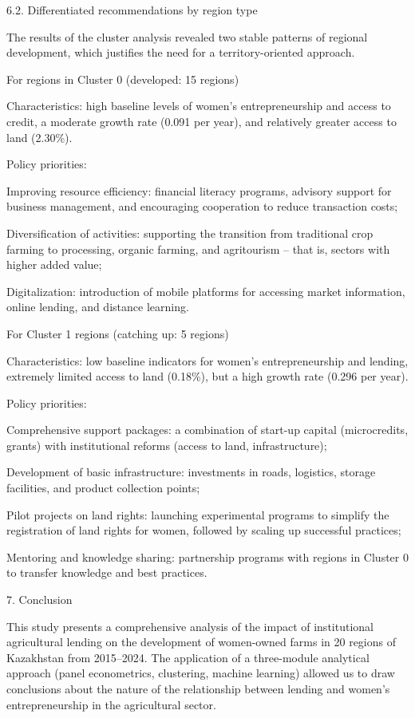 \documentclass[
]{article}
\begin{document}
6.2. Differentiated recommendations by region type

The results of the cluster analysis revealed two stable patterns of
regional development, which justifies the need for a territory-oriented
approach.

For regions in Cluster 0 (developed: 15 regions)

Characteristics: high baseline levels of women's entrepreneurship and
access to credit, a moderate growth rate (0.091 per year), and
relatively greater access to land (2.30\%).

Policy priorities:

Improving resource efficiency: financial literacy programs, advisory
support for business management, and encouraging cooperation to reduce
transaction costs;

Diversification of activities: supporting the transition from
traditional crop farming to processing, organic farming, and agritourism
-- that is, sectors with higher added value;

Digitalization: introduction of mobile platforms for accessing market
information, online lending, and distance learning.

For Cluster 1 regions (catching up: 5 regions)

Characteristics: low baseline indicators for women's entrepreneurship
and lending, extremely limited access to land (0.18\%), but a high
growth rate (0.296 per year).

Policy priorities:

Comprehensive support packages: a combination of start-up capital
(microcredits, grants) with institutional reforms (access to land,
infrastructure);

Development of basic infrastructure: investments in roads, logistics,
storage facilities, and product collection points;

Pilot projects on land rights: launching experimental programs to
simplify the registration of land rights for women, followed by scaling
up successful practices;

Mentoring and knowledge sharing: partnership programs with regions in
Cluster 0 to transfer knowledge and best practices.

7. Conclusion

This study presents a comprehensive analysis of the impact of
institutional agricultural lending on the development of women-owned
farms in 20 regions of Kazakhstan from 2015--2024. The application of a
three-module analytical approach (panel econometrics, clustering,
machine learning) allowed us to draw conclusions about the nature of the
relationship between lending and women's entrepreneurship in the
agricultural sector.
\end{document}

